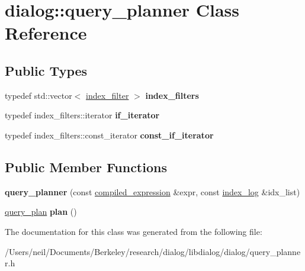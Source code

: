 \hypertarget{classdialog_1_1query__planner}{}\section{dialog\+:\+:query\+\_\+planner Class Reference}
\label{classdialog_1_1query__planner}
\subsection*{Public Types}
\begin{DoxyCompactItemize}
\item 
\mbox{\label{classdialog_1_1query__planner_a7510b75739e2eb9ec585a8e10ec2bfd4}} 
typedef std\+::vector$<$ \hyperlink{classdialog_1_1index__filter}{index\+\_\+filter} $>$ {\bfseries index\+\_\+filters}
\item 
\mbox{\label{classdialog_1_1query__planner_a4779af06f1795c3c64823f9c8e81e155}} 
typedef index\+\_\+filters\+::iterator {\bfseries if\+\_\+iterator}
\item 
\mbox{\label{classdialog_1_1query__planner_a0a361c6b6f817372b7e703b3fb0d4825}} 
typedef index\+\_\+filters\+::const\+\_\+iterator {\bfseries const\+\_\+if\+\_\+iterator}
\end{DoxyCompactItemize}
\subsection*{Public Member Functions}
\begin{DoxyCompactItemize}
\item 
\mbox{\label{classdialog_1_1query__planner_a2769482e5e6a5e272f4801c6a88896b9}} 
{\bfseries query\+\_\+planner} (const \hyperlink{structdialog_1_1compiled__expression}{compiled\+\_\+expression} \&expr, const \hyperlink{classdialog_1_1monolog_1_1monolog__exp2__linear}{index\+\_\+log} \&idx\+\_\+list)
\item 
\mbox{\label{classdialog_1_1query__planner_af2a2e9a97346ac18038033b9083368e3}} 
\hyperlink{classdialog_1_1query__plan}{query\+\_\+plan} {\bfseries plan} ()
\end{DoxyCompactItemize}


The documentation for this class was generated from the following file\+:\begin{DoxyCompactItemize}
\item 
/\+Users/neil/\+Documents/\+Berkeley/research/dialog/libdialog/dialog/query\+\_\+planner.\+h\end{DoxyCompactItemize}

